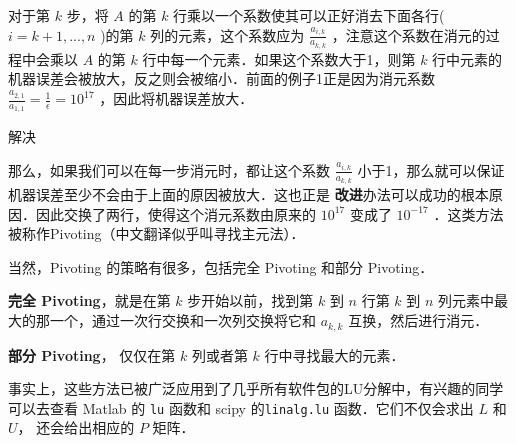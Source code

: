 对于第  $k$  步，将 $A$  的第  $k$  行乘以一个系数使其可以正好消去下面各行(  $i=k+1,...,n$  )的第  $k$  列的元素，这个系数应为  $\frac{a_{i,k}}{a_{k,k}}$  ，注意这个系数在消元的过程中会乘以  $A$  的第  $k $  行中每一个元素．如果这个系数大于1，则第  $k $  行中元素的机器误差会被放大，反之则会被缩小．前面的例子1正是因为消元系数  $\frac{a_{2,1}}{a_{1,1}}=\frac{1}{\epsilon}=10^{17}$  ，因此将机器误差放大．

解决

那么，如果我们可以在每一步消元时，都让这个系数  $\frac{a_{i,k}}{a_{k,k}}$ 小于1，那么就可以保证机器误差至少不会由于上面的原因被放大．这也正是	\textbf{改进}办法可以成功的根本原因．因此交换了两行，使得这个消元系数由原来的  $10^{17}$  变成了  $10^{-17}$  ．这类方法被称作Pivoting（中文翻译似乎叫寻找主元法）．

当然，Pivoting 的策略有很多，包括完全 Pivoting 和部分 Pivoting．

\textbf{完全 Pivoting}，就是在第  $k$ 步开始以前，找到第  $k$  到  $n$  行第  $k$  到  $n$  列元素中最大的那一个，通过一次行交换和一次列交换将它和  $a_{k,k}$  互换，然后进行消元．

\textbf{部分 Pivoting}， 仅仅在第 $k$ 列或者第 $k$ 行中寻找最大的元素．

事实上，这些方法已被广泛应用到了几乎所有软件包的LU分解中，有兴趣的同学可以去查看 Matlab 的 \verb|lu| 函数和 scipy 的\verb|linalg.lu| 函数．它们不仅会求出 $L$ 和 $U$， 还会给出相应的 $P$ 矩阵．
